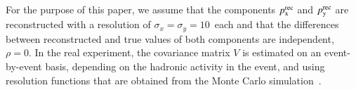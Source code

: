 For the purpose of this paper,
we assume that the components $p_{\textrm{x}}^{\textrm{rec}}$ and $p_{\textrm{y}}^{\textrm{rec}}$ are reconstructed with a resolution of $\sigma_{x} = \sigma_{y} = 10$~\GeV each
and that the differences between reconstructed and true values of both
components are independent, \ie $\rho = 0$.
In the real experiment, the covariance matrix $V$ is estimated on an
event-by-event basis,
depending on the hadronic activity in the event,
and using resolution functions that are obtained from the Monte Carlo simulation~\cite{CMS-JME-10-009,CMS-JME-13-003}.
